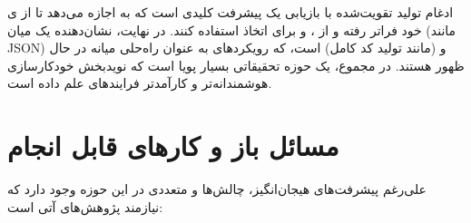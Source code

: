 ادغام تولید تقویت‌شده با بازیابی یک پیشرفت کلیدی است که به  اجازه می‌دهد تا از ی خود فراتر رفته و از ،  و  برای اتخاذ  استفاده کنند. در نهایت،  نشان‌دهنده یک  میان  (مانند JSON) و  (مانند تولید کد کامل) است، که رویکردهای  به عنوان راه‌حلی میانه در حال ظهور هستند. در مجموع،  یک حوزه تحقیقاتی بسیار پویا است که نویدبخش خودکارسازی هوشمندانه‌تر و کارآمدتر فرایندهای علم داده است.

\section{مسائل باز و کارهای قابل انجام}
علی‌رغم پیشرفت‌های هیجان‌انگیز، چالش‌ها و  متعددی در این حوزه وجود دارد که نیازمند پژوهش‌های آتی است:

